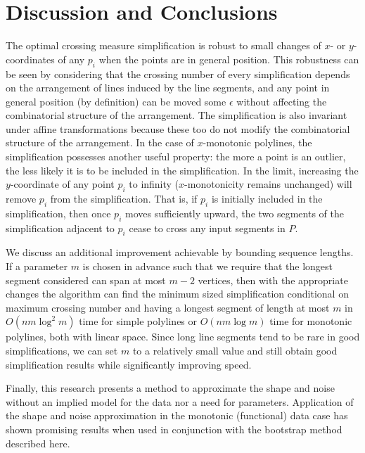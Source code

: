 \documentclass{article}
\begin{document}
\section{Discussion and Conclusions}
\label{sect:discconc}

The optimal crossing measure simplification is robust to small changes
of $x$- or $y$-coordinates of any $p_i$ when the points are in general
position. This robustness can be seen by considering that the crossing
number of every simplification depends on the arrangement of lines
induced by the line segments, and any point in general position (by
definition) can be moved some $\epsilon$ without affecting the
combinatorial structure of the arrangement. The simplification is also
invariant under affine transformations because these too do not modify
the combinatorial structure of the arrangement. In the case of
$x$-monotonic polylines, the simplification possesses another useful
property: the more a point is an outlier, the less likely it is to be
included in the simplification. In the limit, increasing the
$y$-coordinate of any point $p_i$ to infinity ($x$-monotonicity
remains unchanged) will remove $p_i$ from the simplification. That is,
if $p_i$ is initially included in the simplification, then once $p_i$
moves sufficiently upward, the two segments of the simplification
adjacent to $p_i$ cease to cross any input segments in $P$.

We discuss an additional improvement achievable by bounding sequence lengths. 
If a parameter $m$ is chosen in advance such that we require that the
longest segment considered can span at most $m-2$ vertices, then with the
appropriate changes the algorithm can find the minimum sized simplification
conditional on maximum crossing number and having a longest segment of
length at most $m$ in $O(nm\log^2m)$ time for simple polylines or $O(nm\log m)$
time for monotonic polylines, both with linear space.  Since long line
segments tend to be rare in good simplifications, we can set $m$ to a relatively
small value and still obtain good simplification results while significantly
improving speed.

Finally, this research presents a method to approximate the shape and noise
without an implied model for the data nor a need for parameters. 
Application of the shape and noise approximation in the monotonic (functional)
data case has shown promising results when used in conjunction with the
bootstrap method described here.
	


\end{document}
